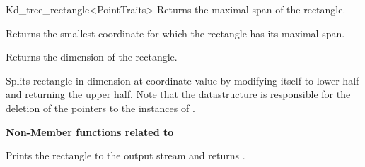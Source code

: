 \begin{ccRefClass}{Kd_tree_rectangle<PointTraits>}
{Returns the maximal span of the rectangle.}

{Returns the smallest coordinate for which the rectangle has its maximal span.}

{Returns the dimension of the rectangle.}

{Splits rectangle in dimension  at coordinate-value  
 by modifying itself to lower half and returning the upper half.
Note that the  datastructure is responsible for the
deletion of the pointers to the instances of .} 

{\bf Non-Member functions related to }

\ccGlueBegin
{} 
{Prints the rectangle  to the output stream  and returns .}
\ccGlueEnd




\end{ccRefClass}


